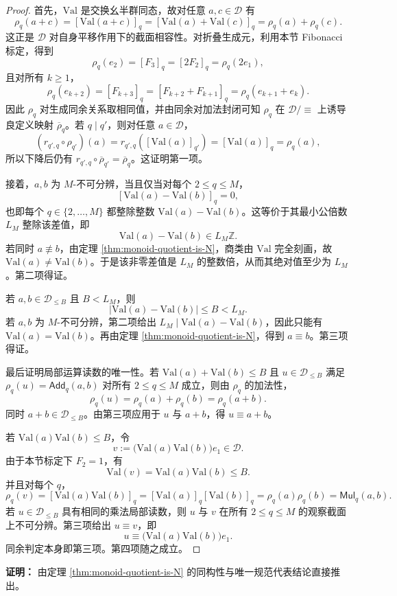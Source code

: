 \begin{proof}
首先，\(\mathrm{Val}\) 是交换幺半群同态，故对任意 \(a,c\in\mathcal{D}\) 有
\[
\rho_q(a+c)=[\mathrm{Val}(a+c)]_q
=[\mathrm{Val}(a)+\mathrm{Val}(c)]_q
=\rho_q(a)+\rho_q(c).
\]
这正是 \(\mathcal{D}\) 对自身平移作用下的截面相容性。对折叠生成元，利用本节 Fibonacci 标定，得到
\[
\rho_q(e_2)=[F_3]_q=[2F_2]_q=\rho_q(2e_1),
\]
且对所有 \(k\ge 1\)，
\[
\rho_q(e_{k+2})=[F_{k+3}]_q=[F_{k+2}+F_{k+1}]_q
=\rho_q(e_{k+1}+e_k).
\]
因此 \(\rho_q\) 对生成同余关系取相同值，并由同余对加法封闭可知 \(\rho_q\) 在 \(\mathcal{D}/\!\equiv\) 上诱导良定义映射 \(\overline{\rho}_q\)。若 \(q\mid q'\)，则对任意 \(a\in\mathcal{D}\)，
\[
(r_{q',q}\circ\rho_{q'})(a)=r_{q',q}([\mathrm{Val}(a)]_{q'})=[\mathrm{Val}(a)]_q=\rho_q(a),
\]
所以下降后仍有 \(r_{q',q}\circ\overline{\rho}_{q'}=\overline{\rho}_q\)。这证明第一项。

接着，\(a,b\) 为 \(M\)-不可分辨，当且仅当对每个 \(2\le q\le M\)，
\[
[\mathrm{Val}(a)-\mathrm{Val}(b)]_q=0,
\]
也即每个 \(q\in\{2,\dots,M\}\) 都整除整数 \(\mathrm{Val}(a)-\mathrm{Val}(b)\)。这等价于其最小公倍数 \(L_M\) 整除该差值，即
\[
\mathrm{Val}(a)-\mathrm{Val}(b)\in L_M\mathbb{Z}.
\]
若同时 \(a\not\equiv b\)，由定理 \ref{thm:monoid-quotient-is-N}，商类由 \(\mathrm{Val}\) 完全刻画，故 \(\mathrm{Val}(a)\ne \mathrm{Val}(b)\)。于是该非零差值是 \(L_M\) 的整数倍，从而其绝对值至少为 \(L_M\)。第二项得证。

若 \(a,b\in\mathcal{D}_{\le B}\) 且 \(B<L_M\)，则
\[
\bigl|\mathrm{Val}(a)-\mathrm{Val}(b)\bigr|\le B<L_M.
\]
若 \(a,b\) 为 \(M\)-不可分辨，第二项给出 \(L_M\mid \mathrm{Val}(a)-\mathrm{Val}(b)\)，因此只能有 \(\mathrm{Val}(a)=\mathrm{Val}(b)\)。再由定理 \ref{thm:monoid-quotient-is-N}，得到 \(a\equiv b\)。第三项得证。

最后证明局部运算读数的唯一性。若 \(\mathrm{Val}(a)+\mathrm{Val}(b)\le B\) 且 \(u\in\mathcal{D}_{\le B}\) 满足 \(\rho_q(u)=\mathsf{Add}_q(a,b)\) 对所有 \(2\le q\le M\) 成立，则由 \(\rho_q\) 的加法性，
\[
\rho_q(u)=\rho_q(a)+\rho_q(b)=\rho_q(a+b).
\]
同时 \(a+b\in\mathcal{D}_{\le B}\)。由第三项应用于 \(u\) 与 \(a+b\)，得 \(u\equiv a+b\)。

若 \(\mathrm{Val}(a)\mathrm{Val}(b)\le B\)，令
\[
v:=\bigl(\mathrm{Val}(a)\mathrm{Val}(b)\bigr)e_1\in\mathcal{D}.
\]
由于本节标定下 \(F_2=1\)，有
\[
\mathrm{Val}(v)=\mathrm{Val}(a)\mathrm{Val}(b)\le B.
\]
并且对每个 \(q\)，
\[
\rho_q(v)=[\mathrm{Val}(a)\mathrm{Val}(b)]_q
=[\mathrm{Val}(a)]_q[\mathrm{Val}(b)]_q
=\rho_q(a)\rho_q(b)=\mathsf{Mul}_q(a,b).
\]
若 \(u\in\mathcal{D}_{\le B}\) 具有相同的乘法局部读数，则 \(u\) 与 \(v\) 在所有 \(2\le q\le M\) 的观察截面上不可分辨。第三项给出 \(u\equiv v\)，即
\[
u\equiv \bigl(\mathrm{Val}(a)\mathrm{Val}(b)\bigr)e_1.
\]
同余判定本身即第三项。第四项随之成立。\end{proof}

\textbf{证明：}
由定理 \ref{thm:monoid-quotient-is-N} 的同构性与唯一规范代表结论直接推出。
